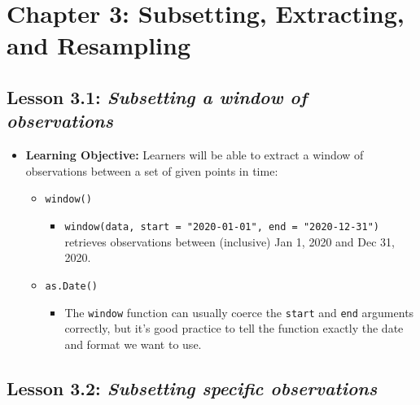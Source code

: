 \documentclass[
]{book}
\providecommand{\tightlist}{%
  \setlength{\itemsep}{0pt}\setlength{\parskip}{0pt}}
\begin{document}
\hypertarget{chapter-3-subsetting-extracting-and-resampling}{%
\section*{Chapter 3: Subsetting, Extracting, and Resampling}\label{chapter-3-subsetting-extracting-and-resampling}}

\hypertarget{lesson-3.1-subsetting-a-window-of-observations}{%
\subsection*{\texorpdfstring{Lesson 3.1: \emph{Subsetting a window of observations}}{Lesson 3.1: Subsetting a window of observations}}\label{lesson-3.1-subsetting-a-window-of-observations}}

\begin{itemize}
\tightlist
\item
  \textbf{Learning Objective:} Learners will be able to extract a window of observations between a set of given points in time:

  \begin{itemize}
  \tightlist
  \item
    \texttt{window()}

    \begin{itemize}
    \tightlist
    \item
      \texttt{window(data,\ start\ =\ "2020-01-01",\ end\ =\ "2020-12-31")} retrieves observations between (inclusive) Jan 1, 2020 and Dec 31, 2020.
    \end{itemize}
  \item
    \texttt{as.Date()}

    \begin{itemize}
    \tightlist
    \item
      The \texttt{window} function can usually coerce the \texttt{start} and \texttt{end} arguments correctly, but it's good practice to tell the function exactly the date and format we want to use.
    \end{itemize}
  \end{itemize}
\end{itemize}

\hypertarget{lesson-3.2-subsetting-specific-observations}{%
\subsection*{\texorpdfstring{Lesson 3.2: \emph{Subsetting specific observations}}{Lesson 3.2: Subsetting specific observations}}\label{lesson-3.2-subsetting-specific-observations}}
\end{document}
